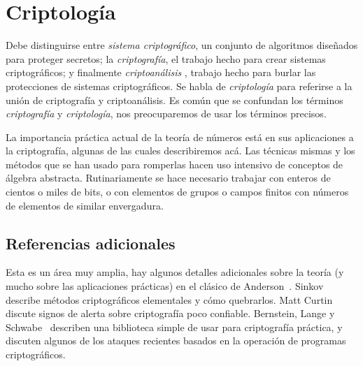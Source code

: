 %

\chapter{Criptología}
\label{cha:criptografia}

  Debe distinguirse entre \emph{sistema criptográfico},%
  un conjunto de algoritmos diseñados para proteger secretos;
  la \emph{criptografía},%
  el trabajo hecho para crear sistemas criptográficos;
  y finalmente \emph{criptoanálisis}%
    ,
  trabajo hecho para burlar las protecciones de sistemas criptográficos.
  Se habla de \emph{criptología}%
  para referirse a la unión de criptografía y criptoanálisis.
  Es común que se confundan los términos \emph{criptografía}
  y \emph{criptología},
  nos preocuparemos de usar los términos precisos.

  La importancia práctica actual de la teoría de números%
  está en sus aplicaciones a la criptografía,
  algunas de las cuales describiremos acá.
  Las técnicas mismas
  y los métodos que se han usado para romperlas
  hacen uso intensivo de conceptos de álgebra abstracta.
  Rutinariamente se hace necesario trabajar
  con enteros de cientos o miles de bits,
  o con elementos de grupos%
  o campos finitos%
  con números de elementos de similar envergadura.

\section{Referencias adicionales}
\label{sec:referencias-adicionales}

  Esta es un área muy amplia,
  hay algunos detalles adicionales sobre la teoría
  (y mucho sobre las aplicaciones prácticas)
  en el clásico de Anderson~\cite{anderson08:_secur_engin}.
  Sinkov~\cite{sinkov09:_elemen_crypt}
  describe métodos criptográficos elementales
  y cómo quebrarlos.
  Matt Curtin~\cite{curtin98:_snake_oil_warnin_signs}
  discute signos de alerta sobre criptografía poco confiable.
  Bernstein, Lange y Schwabe~%
    \cite{bernstein12:_sec_impact_new_crypt_lib}
  describen una biblioteca simple de usar
  para criptografía práctica,
  y discuten algunos de los ataques recientes
  basados en la operación de programas criptográficos.

